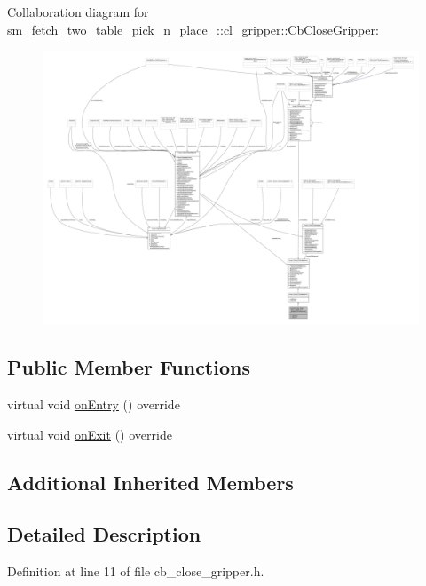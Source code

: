 Collaboration diagram for sm\+\_\+fetch\+\_\+two\+\_\+table\+\_\+pick\+\_\+n\+\_\+place\+\_\+:\+:cl\+\_\+gripper\+:\+:Cb\+Close\+Gripper\+:
\nopagebreak
\begin{figure}[H]
\begin{center}
\leavevmode
\includegraphics[width=350pt]{classsm__fetch__two__table__pick__n__place__1_1_1cl__gripper_1_1CbCloseGripper__coll__graph}
\end{center}
\end{figure}
\subsection*{Public Member Functions}
\begin{DoxyCompactItemize}
\item 
virtual void \hyperlink{classsm__fetch__two__table__pick__n__place__1_1_1cl__gripper_1_1CbCloseGripper_a7f8673e6353c05f3d71225607b2e40bc}{on\+Entry} () override
\item 
virtual void \hyperlink{classsm__fetch__two__table__pick__n__place__1_1_1cl__gripper_1_1CbCloseGripper_a2e50c2e1dec2bdf6cefa39b715ea5d00}{on\+Exit} () override
\end{DoxyCompactItemize}
\subsection*{Additional Inherited Members}


\subsection{Detailed Description}


Definition at line 11 of file cb\+\_\+close\+\_\+gripper.\+h.



